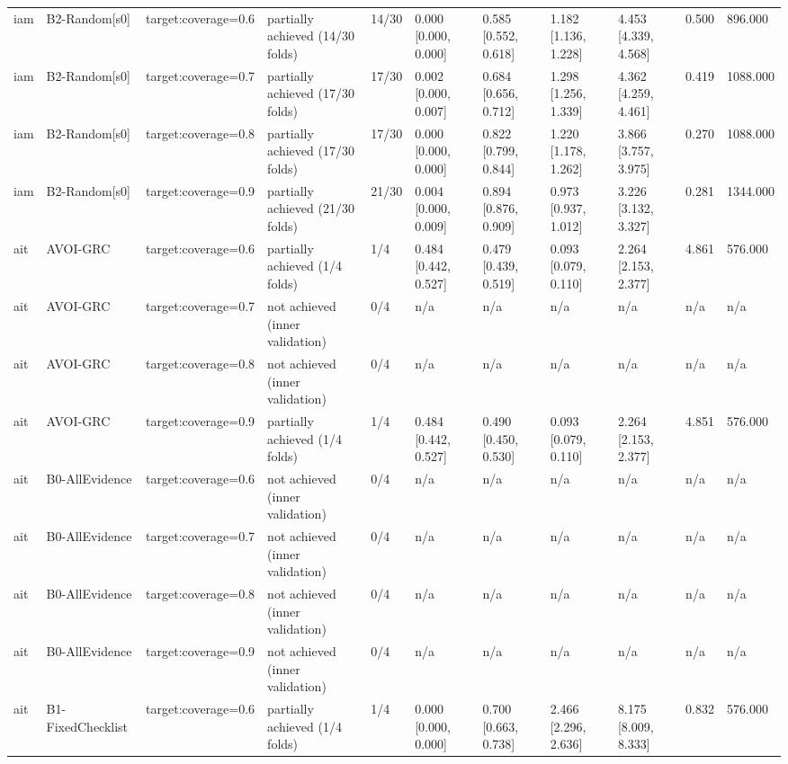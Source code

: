 \begin{table}[!ht]
{\begin{tabular}{lllllllllll}
iam & B2-Random[s0] & target:coverage=0.6 & partially achieved (14/30 folds) & 14/30 & 0.000 [0.000, 0.000] & 0.585 [0.552, 0.618] & 1.182 [1.136, 1.228] & 4.453 [4.339, 4.568] & 0.500 & 896.000 \\
iam & B2-Random[s0] & target:coverage=0.7 & partially achieved (17/30 folds) & 17/30 & 0.002 [0.000, 0.007] & 0.684 [0.656, 0.712] & 1.298 [1.256, 1.339] & 4.362 [4.259, 4.461] & 0.419 & 1088.000 \\
iam & B2-Random[s0] & target:coverage=0.8 & partially achieved (17/30 folds) & 17/30 & 0.000 [0.000, 0.000] & 0.822 [0.799, 0.844] & 1.220 [1.178, 1.262] & 3.866 [3.757, 3.975] & 0.270 & 1088.000 \\
iam & B2-Random[s0] & target:coverage=0.9 & partially achieved (21/30 folds) & 21/30 & 0.004 [0.000, 0.009] & 0.894 [0.876, 0.909] & 0.973 [0.937, 1.012] & 3.226 [3.132, 3.327] & 0.281 & 1344.000 \\
ait & AVOI-GRC & target:coverage=0.6 & partially achieved (1/4 folds) & 1/4 & 0.484 [0.442, 0.527] & 0.479 [0.439, 0.519] & 0.093 [0.079, 0.110] & 2.264 [2.153, 2.377] & 4.861 & 576.000 \\
ait & AVOI-GRC & target:coverage=0.7 & not achieved (inner validation) & 0/4 & n/a & n/a & n/a & n/a & n/a & n/a \\
ait & AVOI-GRC & target:coverage=0.8 & not achieved (inner validation) & 0/4 & n/a & n/a & n/a & n/a & n/a & n/a \\
ait & AVOI-GRC & target:coverage=0.9 & partially achieved (1/4 folds) & 1/4 & 0.484 [0.442, 0.527] & 0.490 [0.450, 0.530] & 0.093 [0.079, 0.110] & 2.264 [2.153, 2.377] & 4.851 & 576.000 \\
ait & B0-AllEvidence & target:coverage=0.6 & not achieved (inner validation) & 0/4 & n/a & n/a & n/a & n/a & n/a & n/a \\
ait & B0-AllEvidence & target:coverage=0.7 & not achieved (inner validation) & 0/4 & n/a & n/a & n/a & n/a & n/a & n/a \\
ait & B0-AllEvidence & target:coverage=0.8 & not achieved (inner validation) & 0/4 & n/a & n/a & n/a & n/a & n/a & n/a \\
ait & B0-AllEvidence & target:coverage=0.9 & not achieved (inner validation) & 0/4 & n/a & n/a & n/a & n/a & n/a & n/a \\
ait & B1-FixedChecklist & target:coverage=0.6 & partially achieved (1/4 folds) & 1/4 & 0.000 [0.000, 0.000] & 0.700 [0.663, 0.738] & 2.466 [2.296, 2.636] & 8.175 [8.009, 8.333] & 0.832 & 576.000 \\

\end{tabular}}
\end{table}
